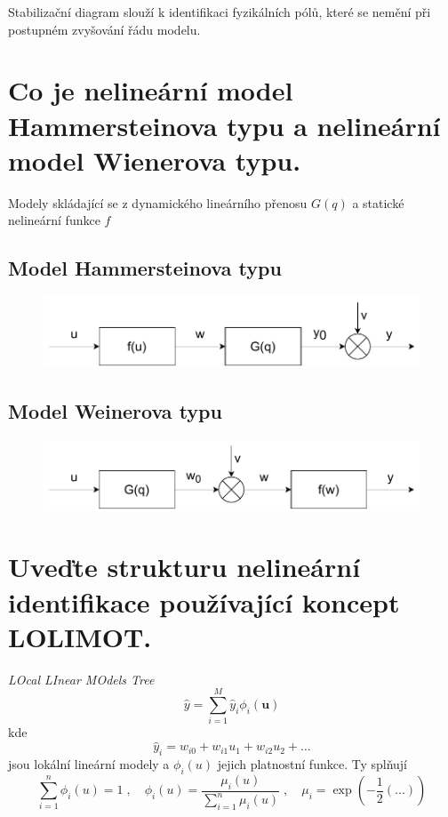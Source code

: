 \documentclass{article}
\begin{document}
	Stabilizační diagram slouží k identifikaci fyzikálních pólů, které se nemění při postupném zvyšování řádu modelu.
	
	\section{Co je nelineární model Hammersteinova typu a nelineární model Wienerova typu. }

	Modely skládající se z dynamického lineárního přenosu $G(q)$ a statické nelineární funkce $f$
	
	\subsection*{Model Hammersteinova typu}	
	\begin{figure}[h!]
		\centering
		\includegraphics[width=.6\linewidth]{figs/HammersteinuvModel.pdf}
	\end{figure}
	
	\subsection*{Model Weinerova typu}	
	\begin{figure}[h!]
		\centering
		\includegraphics[width=.6\linewidth]{figs/WeineruvModel.pdf}
	\end{figure}

	\section{Uveďte strukturu nelineární identifikace používající koncept LOLIMOT. } \label{lolimot}
	\emph{LOcal LInear MOdels Tree}
	\begin{equation}
		\hat{y} = \sum_{i=1}^M \hat{y}_i \phi_i(\bm{u})
	\end{equation}
	kde
	\begin{equation}
		\hat{y}_i = w_{i0} + w_{i1} u_1 + w_{i2} u_2 + \dots
	\end{equation}
	jsou lokální lineární modely a $\phi_i(u)$ jejich platnostní funkce. Ty splňují
	\begin{equation}
		\sum_{i=1}^n \phi_i(u) = 1
		\;,\quad 
		\phi_i(u) = \frac{\mu_i(u)}{\sum_{i=1}^n \mu_i(u)}
		\;,\quad 
		\mu_i = \exp(-\frac{1}{2}(...))
	\end{equation}
\end{document}
